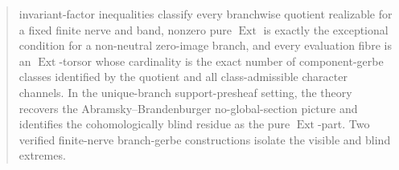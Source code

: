 \documentclass[reqno]{amsart}
\theoremstyle{definition}
\theoremstyle{remark}
\begin{document}
\begin{abstract}
invariant-factor inequalities classify every branchwise quotient realizable for a fixed finite nerve and band, nonzero pure $\operatorname{Ext}$ is exactly the exceptional condition for a non-neutral zero-image branch, and every evaluation fibre is an $\operatorname{Ext}$-torsor whose cardinality is the exact number of component-gerbe classes identified by the quotient and all class-admissible character channels. In the unique-branch support-presheaf setting, the theory recovers the Abramsky--Brandenburger no-global-section picture and identifies the cohomologically blind residue as the pure $\operatorname{Ext}$-part. Two verified finite-nerve branch-gerbe constructions isolate the visible and blind extremes.
\end{abstract}


\maketitle















\end{document}
